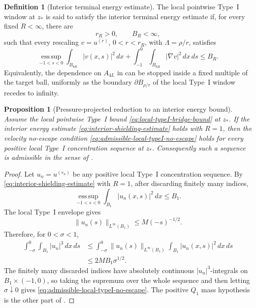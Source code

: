 \documentclass[11pt]{amsart}
\numberwithin{equation}{section}
\theoremstyle{plain}
\newtheorem{proposition}[theorem]{Proposition}
\theoremstyle{definition}
\newtheorem{definition}[theorem]{Definition}
\theoremstyle{remark}
\newcommand{\esssup}{\operatorname*{ess\,sup}}
\begin{document}
\begin{definition}[Interior terminal energy estimate]
\label{def:interior-shielding-estimate}
The local pointwise Type~I window at \(z_*\) is said to satisfy the interior
terminal energy estimate if, for every fixed \(R<\infty\), there are
\[
   r_R>0,\qquad B_R<\infty,
\]
such that every rescaling \(v=u^{(r)}\), \(0<r<r_R\), with
\(\Lambda=\rho/r\), satisfies
\begin{equation}\label{eq:interior-shielding-estimate}
   \esssup_{-1<s<0}\int_{B_{8R}}|v(x,s)|^2\,dx
   +\int_{-1}^{0}\int_{B_{8R}}|\nabla v|^2\,dx\,ds
   \le B_R .
\end{equation}
Equivalently, the dependence on \(A_{4L}\) in
 can be stopped inside a fixed
multiple of the target ball, uniformly as the boundary
\(\partial B_{\rho/r}\) of the local Type~I window recedes to infinity.
\end{definition}

\begin{proposition}[Pressure-projected reduction to an interior energy bound]
\label{prop:pressure-projection-reduces-to-shielding}
Assume the local pointwise Type~I bound \eqref{eq:local-typeI-bridge-bound} at
\(z_*\).  If the interior energy estimate
\eqref{eq:interior-shielding-estimate} holds with \(R=1\), then the velocity
no-escape condition \eqref{eq:admissible-local-typeI-no-escape} holds for every
positive local Type~I concentration sequence at \(z_*\).  Consequently such a
sequence is admissible in the sense of
.
\end{proposition}

\begin{proof}
Let \(u_n=u^{(r_n)}\) be any positive local Type~I concentration sequence.  By
\eqref{eq:interior-shielding-estimate} with \(R=1\), after discarding finitely
many indices,
\[
   \esssup_{-1<s<0}\int_{B_1}|u_n(x,s)|^2\,dx\le B_1 .
\]
The local Type~I envelope gives
\[
   \|u_n(s)\|_{L^\infty(B_1)}\le M(-s)^{-1/2}.
\]
Therefore, for \(0<\sigma<1\),
\[
\begin{aligned}
   \int_{-\sigma}^{0}\int_{B_1}|u_n|^3\,dx\,ds
   &\le
   \int_{-\sigma}^{0}
      \|u_n(s)\|_{L^\infty(B_1)}
      \int_{B_1}|u_n(x,s)|^2\,dx\,ds    \\
   &\le
   2MB_1\sigma^{1/2}.
\end{aligned}
\]
The finitely many discarded indices have absolutely continuous
\(|u_n|^3\)-integrals on \(B_1\times(-1,0)\), so taking the supremum over the
whole sequence and then letting \(\sigma\downarrow0\) gives
\eqref{eq:admissible-local-typeI-no-escape}.  The positive \(Q_1\) mass
hypothesis is the other part of
.
\end{proof}
\end{document}
